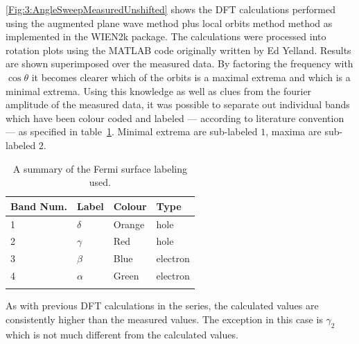 {{{\Fig\ref{Fig:3:AngleSweepMeasuredUnshifted} shows the DFT calculations performed using the augmented plane wave method plus local orbits method method as implemented in the WIEN2k package\cite{Blaha2001}. The calculations were processed into rotation plots using the MATLAB code originally written by Ed Yelland. Results are shown superimposed over the measured data. By factoring the frequency with $\cos{\theta}$ it becomes clearer which of the orbits is a maximal extrema and which is a minimal extrema. Using this knowledge as well as clues from the fourier amplitude of the measured data, it was possible to separate out individual bands which have been colour coded and labeled --- according to literature convention --- as specified in table~\ref{Table:3:BandNaming}. Minimal extrema are sub-labeled $1$, maxima are sub-labeled $2$.
\begin{table}
    \begin{center}
        \caption{A summary of the Fermi surface labeling used.}
        \begin{tabular}[!h]{llll}
\toprule
Band Num.  & Label & Colour    & Type \\
\midrule
1   & $\delta$  & Orange    & hole \\
2   & $\gamma$  & Red   & hole \\
3   & $\beta$   & Blue  & electron \\
4   & $\alpha$  & Green & electron \\
\bottomrule
        \label{Table:3:BandNaming}
        \end{tabular}
    \end{center}
\end{table}
As with previous DFT calculations in the \BaFePAs series, the calculated values are consistently higher than the measured values. The exception in this case is $\gamma_2$ which is not much different from the calculated values.
\begin{figure}
    \begin{center}

\end{center}
\end{figure}}}}
